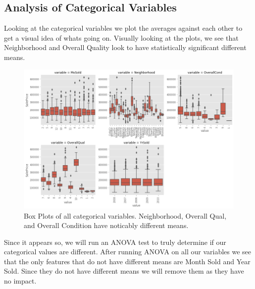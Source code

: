 \documentclass{article}
\begin{document}
	

	\subsection{Analysis of Categorical Variables}

	Looking at the categorical variables we plot the averages against each other to get a visual idea of whats going on. Visually looking at the plots, we see that Neighborhood and Overall Quality look to have statistically significant different means. 
	
	\begin{figure}[H]
		\includegraphics[width=\textwidth]{catboxes}
		\caption{Box Plots of all categorical variables. Neighborhood, Overall Qual, and Overall Condition have noticably different means.}
		\label{fig:cats}
	\end{figure}
	
	Since it appears so, we will run an ANOVA test to truly determine if our categorical values are different. After running ANOVA on all our variables we see that the only features that do not have different means are Month Sold and Year Sold. Since they do not have different means we will remove them as they have no impact. 
	
\end{document}
